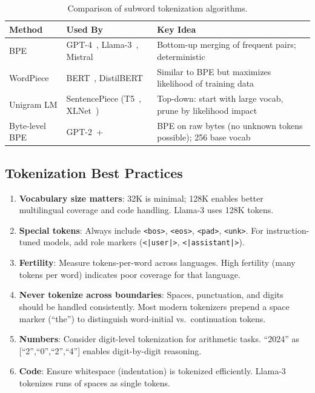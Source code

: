 \begin{table}[ht!]
\centering
\caption{Comparison of subword tokenization algorithms.}
\begin{tabular}{@{}lp{4cm}p{7cm}@{}}
\toprule
\textbf{Method} & \textbf{Used By} & \textbf{Key Idea} \\
\midrule
BPE & GPT-4~\cite{openai2023gpt4}, Llama-3~\cite{grattafiori2024llama3}, Mistral~\cite{jiang2023mistral} & Bottom-up merging of frequent pairs; deterministic \\
WordPiece & BERT~\cite{devlin2019bert}, DistilBERT~\cite{sanh2019distilbert} & Similar to BPE but maximizes likelihood of training data \\
Unigram LM & SentencePiece (T5~\cite{raffel2020t5}, XLNet~\cite{yang2019xlnet}) & Top-down: start with large vocab, prune by likelihood impact \\
Byte-level BPE & GPT-2~\cite{radford2019gpt2}+ & BPE on raw bytes (no unknown tokens possible); 256 base vocab \\
\bottomrule
\end{tabular}
\end{table}

\subsection{Tokenization Best Practices}
\label{tokenization-best-practices}

\begin{enumerate}
  \item \textbf{Vocabulary size matters}: 32K is minimal; 128K enables better multilingual coverage and code handling. Llama-3 uses 128K tokens.
  \item \textbf{Special tokens}: Always include \texttt{<bos>}, \texttt{<eos>}, \texttt{<pad>}, \texttt{<unk>}. For instruction-tuned models, add role markers (\texttt{<|user|>}, \texttt{<|assistant|>}).
  \item \textbf{Fertility}: Measure tokens-per-word across languages. High fertility (many tokens per word) indicates poor coverage for that language.
  \item \textbf{Never tokenize across boundaries}: Spaces, punctuation, and digits should be handled consistently. Most modern tokenizers prepend a space marker (``the'') to distinguish word-initial vs.~continuation tokens.
  \item \textbf{Numbers}: Consider digit-level tokenization for arithmetic tasks. ``2024'' as [``2'',``0'',``2'',``4''] enables digit-by-digit reasoning.
  \item \textbf{Code}: Ensure whitespace (indentation) is tokenized efficiently. Llama-3 tokenizes runs of spaces as single tokens.
\end{enumerate}

